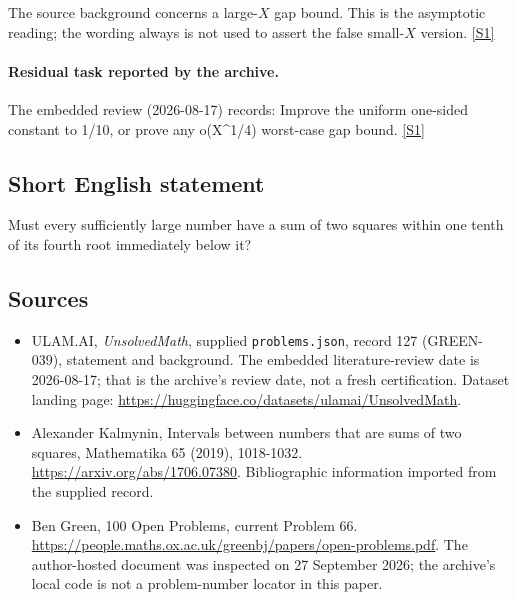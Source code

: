 \documentclass[11pt,a4paper]{article}
\newcommand{\sref}[2]{\hyperlink{source:#1:#2}{[S#2]}}
\begin{document}
The source background concerns a large-$X$ gap bound. This is the asymptotic reading; the wording always is not used to assert the false small-$X$ version. \sref{127}{1}

\paragraph{Residual task reported by the archive.}

The embedded review (2026-08-17) records: Improve the uniform one-sided constant to 1/10, or prove any o(X\textasciicircum{}{1/4}) worst-case gap bound. \sref{127}{1}

\subsection{Short English statement}

Must every sufficiently large number have a sum of two squares within one tenth of its fourth root immediately below it?

\subsection{Sources}

{\small

\begin{itemize}

\item[\hypertarget{source:127:1}{S1}] ULAM.AI, \emph{UnsolvedMath}, supplied \texttt{problems.json}, record 127 (GREEN-039), statement and background. The embedded literature-review date is 2026-08-17; that is the archive’s review date, not a fresh certification. Dataset landing page: \url{https://huggingface.co/datasets/ulamai/UnsolvedMath}.

\item[\hypertarget{source:127:2}{S2}] Alexander Kalmynin, Intervals between numbers that are sums of two squares, Mathematika 65 (2019), 1018-1032. \url{https://arxiv.org/abs/1706.07380}. Bibliographic information imported from the supplied record.

\item[\hypertarget{source:127:3}{S3}] Ben Green, 100 Open Problems, current Problem 66. \url{https://people.maths.ox.ac.uk/greenbj/papers/open-problems.pdf}. The author-hosted document was inspected on 27 September 2026; the archive’s local code is not a problem-number locator in this paper.

\end{itemize}

}

\label{end:127}
\end{document}
